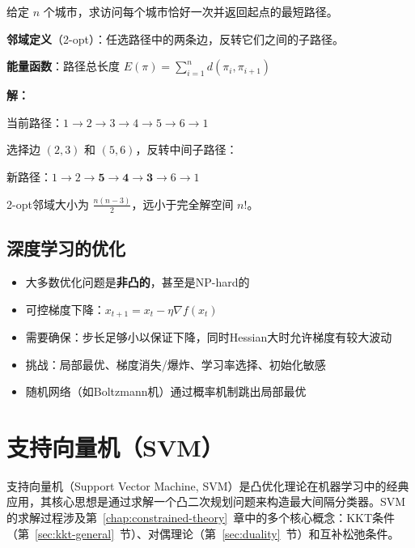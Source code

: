 \begin{conceptbox}[TSP的SA求解]
给定 $n$ 个城市，求访问每个城市恰好一次并返回起点的最短路径。

\textbf{邻域定义}（2-opt）：任选路径中的两条边，反转它们之间的子路径。

\textbf{能量函数}：路径总长度 $E(\pi) = \sum_{i=1}^{n} d(\pi_i, \pi_{i+1})$
\end{conceptbox}

\begin{example}
\textbf{解：}

当前路径：$1 \to 2 \to 3 \to 4 \to 5 \to 6 \to 1$

选择边 $(2,3)$ 和 $(5,6)$，反转中间子路径：

新路径：$1 \to 2 \to \textbf{5} \to \textbf{4} \to \textbf{3} \to 6 \to 1$

2-opt邻域大小为 $\frac{n(n-3)}{2}$，远小于完全解空间 $n!$。
\end{example}

\subsection{深度学习的优化}

\begin{notebox}[深度学习中的优化特点]
\begin{itemize}[itemsep=0.3em]
    \item 大多数优化问题是\textbf{非凸的}，甚至是NP-hard的
    \item 可控梯度下降：$x_{t+1} = x_t - \eta \nabla f(x_t)$
    \item 需要确保：步长足够小以保证下降，同时Hessian大时允许梯度有较大波动
    \item 挑战：局部最优、梯度消失/爆炸、学习率选择、初始化敏感
    \item 随机网络（如Boltzmann机）通过概率机制跳出局部最优
\end{itemize}
\end{notebox}

\newpage

\section{支持向量机（SVM）}\label{sec:svm}

支持向量机（Support Vector Machine, SVM）是凸优化理论在机器学习中的经典应用，其核心思想是通过求解一个凸二次规划问题来构造最大间隔分类器。SVM的求解过程涉及第~\ref{chap:constrained-theory}~章中的多个核心概念：KKT条件（第~\ref{sec:kkt-general}~节）、对偶理论（第~\ref{sec:duality}~节）和互补松弛条件。

